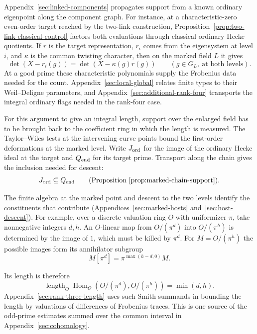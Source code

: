 Appendix~\ref{sec:linked-components} propagates support from a known
ordinary eigenpoint along the component graph. For instance, at a
characteristic-zero even-order target reached by the two-link construction,
Proposition~\ref{prop:two-link-classical-control} factors both
evaluations through classical ordinary Hecke quotients. If \(r\) is
the target representation, \(r_i\) comes from the eigensystem at
level \(i\), and \(\kappa\) is the common twisting character, then on
the marked field \(L\) it gives
\[
 \det(X-r_i(g))=\det(X-\kappa(g)r(g))
       \qquad(g\in G_L,\ \text{at both levels}).
\]
At a good prime these characteristic polynomials supply the Frobenius data needed for
the count. Appendix~\ref{sec:local-global} relates finite types to their
Weil--Deligne parameters, and Appendix~\ref{sec:additional-rank-four}
transports the integral ordinary flags needed in the rank-four case.

For this argument to give an integral length, support over the
enlarged field has to be brought back to the coefficient ring in which
the length is measured. The Taylor--Wiles tests at the intervening
curve points bound the first-order deformations at the marked level.
Write \(J_{\rm ord}\) for the image of the ordinary Hecke ideal at the
target and \(Q_{\rm end}\) for its target prime. Transport along the
chain gives the inclusion needed for descent:
\[
             J_{\rm ord}\subseteq Q_{\rm end}
             \qquad\text{(Proposition~\ref{prop:marked-chain-support}).}
\]

The finite algebra at the
marked point and descent to the two levels identify the constituents
that contribute (Appendices~\ref{sec:marked-hosts} and~\ref{sec:host-descent}).
For example, over a discrete valuation ring \(O\) with uniformizer
\(\pi\), take nonnegative integers \(d,h\). An \(O\)-linear
map from \(O/(\pi^d)\) into \(O/(\pi^h)\)
is determined by the image of \(1\), which must be killed by \(\pi^d\).
For \(M=O/(\pi^h)\) the possible images form its annihilator subgroup
\[
               M[\pi^d]=\pi^{\max(h-d,0)}M .
\]

Its length is therefore
\[
             \operatorname{length}_O\operatorname{Hom}_O
                      (O/(\pi^d),O/(\pi^h))=\min(d,h).
\]
Appendix~\ref{sec:rank-three-length} uses such Smith summands in
bounding the length by valuations of differences of Frobenius traces.
This is one source of the odd-prime estimates summed over the common
interval in Appendix~\ref{sec:cohomology}.

